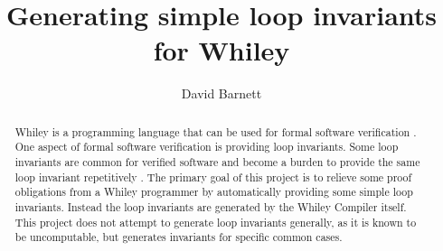 \documentclass[11pt
              , a4paper
              , openright
              ]{report}
\title{Generating simple loop invariants for Whiley}
\author{David Barnett}
\date{}
\begin{document}
\frontmatter



\begin{abstract}
Whiley is a programming language that can be used for formal software
verification \cite{whiley-origin}.
One aspect of formal software verification is providing loop
invariants.
Some loop invariants are common for verified software and become a burden to
provide the same loop invariant repetitively \cite{whiley-reflection}\cite{spec-usability}.
The primary goal of this project is to relieve some proof obligations from a
Whiley programmer by automatically providing some simple loop invariants.
Instead the loop invariants are generated by the Whiley Compiler itself.
This project does not attempt to generate loop invariants generally, as it is
known to be uncomputable, but generates invariants for specific common cases.

\end{abstract}


\maketitle



\tableofcontents



\mainmatter












\backmatter




%

\end{document}
